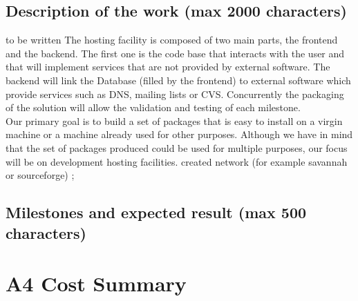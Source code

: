 \documentclass[a4paper,11pt]{report}
\begin{document}
\subsection*{Description of the work (max 2000 characters)} to be written
The hosting facility is composed of two main parts, the frontend and the
backend. The first one is the code base that interacts with the user and that
will implement services that are not provided by external software. The backend
will link the Database (filled by the frontend) to external software which
provide services such as DNS, mailing lists or CVS. Concurrently the packaging
of the solution will allow the validation and testing of each milestone.\\
Our primary goal is to build a set of packages that is easy to
install on a virgin machine or a machine already used for other
purposes. 
Although we have in mind that the set of packages produced could be used for
multiple purposes, our focus will be on development hosting facilities. 
created network (for example savannah or sourceforge) ;

\subsection*{Milestones and expected result (max 500 characters)}
\section*{A4 Cost Summary}
\end{document}
